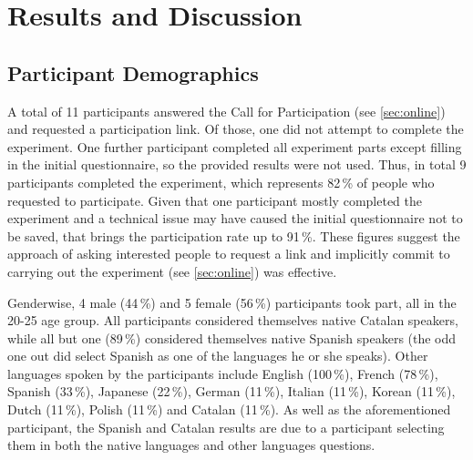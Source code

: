 
\chapter{Results and Discussion} %
\label{ch:results}


\section{Participant Demographics}


\noindent A total of 11 participants answered the Call for Participation (see \autoref{sec:online}) and requested a participation link. Of those, one did not attempt to complete the experiment. One further participant completed all experiment parts except filling in the initial questionnaire, so the provided results were not used. Thus, in total 9 participants completed the experiment, which represents 82\,\% of people who requested to participate. Given that one participant mostly completed the experiment and a technical issue may have caused the initial questionnaire not to be saved, that brings the participation rate up to 91\,\%. These figures suggest the approach of asking interested people to request a link and implicitly commit to carrying out the experiment (see \autoref{sec:online}) was effective.

Genderwise, 4 male (44\,\%) and 5 female (56\,\%) participants took part, all in the 20-25 age group. All participants considered themselves native Catalan speakers, while all but one (89\,\%) considered themselves native Spanish speakers (the odd one out did select Spanish as one of the languages he or she speaks). Other languages spoken by the participants include English (100\,\%), French (78\,\%), Spanish (33\,\%), Japanese (22\,\%), German (11\,\%), Italian (11\,\%), Korean (11\,\%), Dutch (11\,\%), Polish (11\,\%) and Catalan (11\,\%). As well as the aforementioned participant, the Spanish and Catalan results are due to a participant selecting them in both the native languages and other languages questions.

